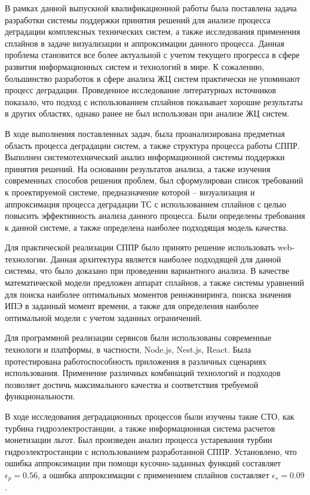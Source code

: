 
В рамках данной выпускной квалификационной работы была поставлена задача разработки системы поддержки принятия решений для анализе процесса деградации комплексных технических систем, а также исследования применения сплайнов в задаче визуализации и аппроксимации данного процесса. 
Данная проблема становится все более актуальной с учетом текущего прогресса в сфере развития информационных систем и технологий в мире. 
К сожалению, большинство разработок в сфере анализа ЖЦ систем практически не упоминают процесс деградации. 
Проведенное исследование литературных источников показало, что подход с использованием сплайнов показывает хорошие результаты в других областях, однако ранее не был использован при анализе ЖЦ систем. 

В ходе выполнения поставленных задач, была проанализирована предметная область процесса деградации систем, а также структура процесса работы СППР. 
Выполнен системотехнический анализ информационной системы поддержки принятия решений.
На основании результатов анализа, а также изучения современных способов решения проблем, был сформулирован список требований к проектируемой системе, предназначение которой – визуализация и аппроксимация процесса деградации ТС с использованием сплайнов с целью повысить эффективность анализа данного процесса. 
Были определены требования к данной системе, а также определена наиболее подходящая модель качества.

Для практической реализации СППР было принято решение использовать web-технологии. 
Данная архитектура является наиболее подходящей для данной системы, что было доказано при проведении вариантного анализа. 
В качестве математической модели предложен аппарат сплайнов, а также системы уравнений для поиска наиболее оптимальных моментов реинжиниринга, поиска значения ИПЭ в заданный момент времени, а также для определения наиболее оптимальной модели с учетом заданных ограничений.

Для программной реализации сервисов были использованы современные технологи и платформы, в частности, Node.js, Nest.js, React. 
Была протестирована работоспособность приложения в различных сценариях использования.
Применение различных комбинаций технологий и подходов позволяет достичь максимального качества и соответствия требуемой функциональности.

В ходе исследования деградационных процессов были изучены такие СТО, как турбина гидроэлектростанции,
а также информационная система расчетов монетизации льгот.
Был произведен анализ процесса устаревания турбин гидроэлектростанции с использованием разработанной СППР.
Установлено, что ошибка аппроксимации при помощи кусочно-заданных функций составляет $\epsilon_p=0.56$,
а ошибка аппроксимации с применением сплайнов составляет $\epsilon_s=0.09$.

